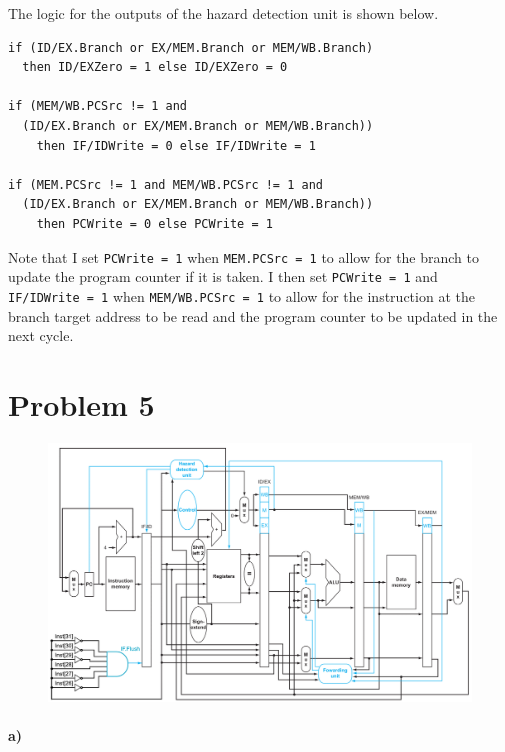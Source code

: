 \documentclass[12pt]{article}
\begin{document}
The logic for the outputs of the hazard detection unit is shown below.
\begin{verbatim}
if (ID/EX.Branch or EX/MEM.Branch or MEM/WB.Branch)
  then ID/EXZero = 1 else ID/EXZero = 0

if (MEM/WB.PCSrc != 1 and
  (ID/EX.Branch or EX/MEM.Branch or MEM/WB.Branch))
    then IF/IDWrite = 0 else IF/IDWrite = 1

if (MEM.PCSrc != 1 and MEM/WB.PCSrc != 1 and
  (ID/EX.Branch or EX/MEM.Branch or MEM/WB.Branch))
    then PCWrite = 0 else PCWrite = 1
\end{verbatim}
Note that I set \texttt{PCWrite = 1} when \texttt{MEM.PCSrc = 1} to allow for the branch to update the program counter if it is taken. I then
set \texttt{PCWrite = 1} and \texttt{IF/IDWrite = 1} when \texttt{MEM/WB.PCSrc = 1} to allow for the instruction at the branch target address to be read and the
program counter to be updated in the next cycle.

\pagebreak

\section*{Problem 5}

\begin{figure}[!ht]
        \hspace*{-4cm}
        \begin{center}
                \includegraphics[width=4.8in]{problem5a.png}
        \end{center}
        \hspace*{-4cm}
\end{figure}

\paragraph{a)}
\end{document}
